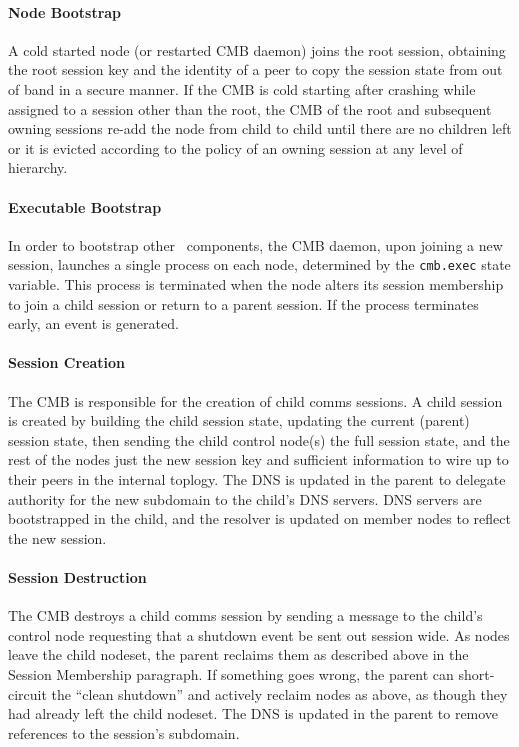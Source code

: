 \paragraph{Node Bootstrap}
A cold started node (or restarted CMB daemon) joins the root session,
obtaining the root session key and the identity of a peer to copy the
session state from out of band in a secure manner.
If the CMB is cold starting after crashing while assigned to
a session other than the root, the CMB of the root and subsequent owning
sessions re-add the node from child to child until there are no children
left or it is evicted according to the policy of an owning session
at any level of hierarchy.

\paragraph{Executable Bootstrap}
In order to bootstrap other \ngrm\ components, the CMB daemon, upon
joining a new session, launches a single process on each node,
determined by the {\tt cmb.exec} state variable.
This process is terminated when the node alters its session membership
to join a child session or return to a parent session.
If the process terminates early, an event is generated.


\paragraph{Session Creation}
The CMB is responsible for the creation of
child comms sessions.
A child session is created by building the child session state,
updating the current (parent) session state, then sending the
child control node(s) the full session state, and the rest of the nodes
just the new session key and sufficient information to wire up to their
peers in the internal toplogy.
The DNS is updated in the parent to delegate authority
for the new subdomain to the child's DNS servers.
DNS servers are bootstrapped in the child, and the resolver is updated
on member nodes to reflect the new session.

\paragraph{Session Destruction}
The CMB destroys a child comms session by sending a message to the child's
control node requesting that a shutdown event be sent out session wide.
As nodes leave the child nodeset, the parent reclaims them as described 
above in the Session Membership paragraph.
If something goes wrong, the parent can short-circuit the ``clean shutdown''
and actively reclaim nodes as above, as though they had already left the
child nodeset.
The DNS is updated in the parent to remove references to the session's
subdomain.

